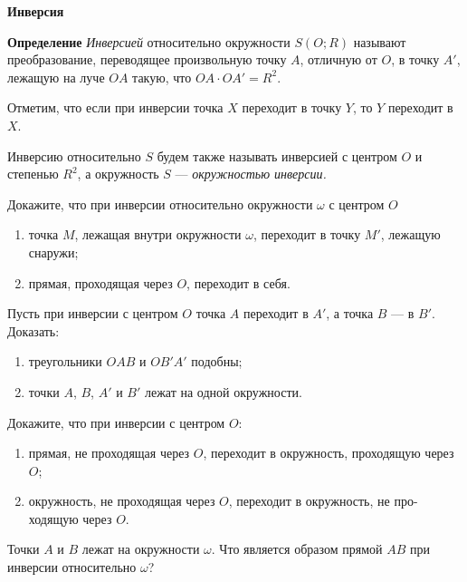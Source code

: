 \documentclass{article}
\begin{document}
    \large

    \begin{center}
        \textbf{Инверсия}
    \end{center}

    \textbf{Определение} \textit{Инверсией} относительно окружности $S(O; R)$ называют преобразование, переводящее произвольную точку $A$, отличную от $O$, в точку $A'$, лежащую на луче $OA$ такую, что $OA \cdot OA' = R^2$.

    Отметим, что если при инверсии точка $X$ переходит в точку $Y$, то $Y$ переходит в $X$.

    Инверсию относительно $S$ будем также называть инверсией с центром $O$ и степенью $R^2$, а окружность $S$ — \textit{окружностью инверсии.}

    \begin{enumerate_boxed}

        \item Докажите, что при инверсии относительно окружности $\omega$ с центром $O$
        \begin{enumerate}[label=\alph*)]
            \item точка $M$, лежащая внутри окружности $\omega$, переходит в точку $M'$, лежащую снаружи;
            \item прямая, проходящая через $O$, переходит в себя.
        \end{enumerate}

        \item Пусть при инверсии с центром $O$ точка $A$ переходит в $A'$, а точка $B$ — в $B'$. Доказать:
        \begin{enumerate}[label=\alph*)]
            \item треугольники $OAB$ и $OB'A'$ подобны;
            \item точки $A$, $B$, $A'$ и $B'$ лежат на одной окружности.
        \end{enumerate}

        \item Докажите, что при инверсии с центром $O$:
        \begin{enumerate}[label=\alph*)]
            \item прямая, не проходящая через $O$, переходит в окружность, проходящую через $O$;
            \item окружность, не проходящая через $O$, переходит в окружность, не про- ходящую через $O$.
        \end{enumerate}

        \item Точки $A$ и $B$ лежат на окружности $\omega$.
        Что является образом прямой $AB$ при инверсии относительно $\omega$?


\end{enumerate_boxed}
\end{document}
